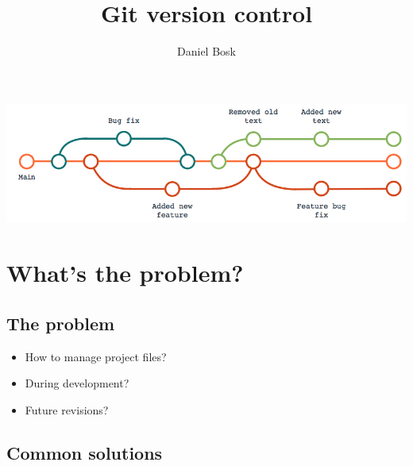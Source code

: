 \title{%
  Git version control
}
\author{Daniel Bosk}


\mode*

\begin{abstract}
  
\end{abstract}


\begin{frame}
  \centering
  \includegraphics[width=\columnwidth]{figs/version-tree.png}
\end{frame}


\section{What's the problem?}

\subsection{The problem}

\begin{frame}
  \begin{question}
    \begin{itemize}
      \item How to manage project files?
      \item During development?
      \item Future revisions?
    \end{itemize}
  \end{question}
\end{frame}

\subsection{Common solutions}

